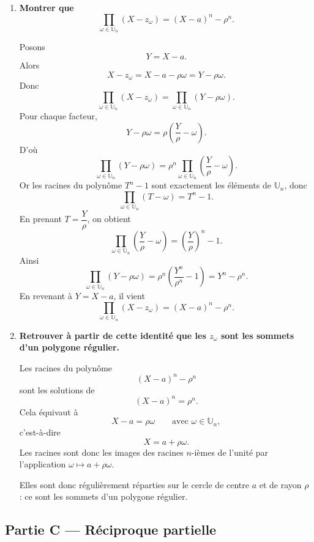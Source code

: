 \documentclass[11pt,a4paper]{article}
\newcommand{\U}{\mathbb{U}}
\begin{document}
\begin{enumerate}[label=\textbf{B.\arabic*.}]
    La quantité
    \[
    \frac1n\sum_{\omega\in\U_n}z_\omega
    \]
    est l’affixe du barycentre des sommets du polygone, pris avec des coefficients égaux.

    Le résultat signifie donc que le barycentre des sommets d’un polygone régulier est son centre.

    \item \textbf{Montrer que
    \[
    \prod_{\omega\in\U_n}(X-z_\omega)=(X-a)^n-\rho^n.
    \]}

    Posons
    \[
    Y=X-a.
    \]
    Alors
    \[
    X-z_\omega=X-a-\rho\omega=Y-\rho\omega.
    \]
    Donc
    \[
    \prod_{\omega\in\U_n}(X-z_\omega)=\prod_{\omega\in\U_n}(Y-\rho\omega).
    \]
    Pour chaque facteur,
    \[
    Y-\rho\omega=\rho\left(\frac{Y}{\rho}-\omega\right).
    \]
    D’où
    \[
    \prod_{\omega\in\U_n}(Y-\rho\omega)
    =\rho^n\prod_{\omega\in\U_n}\left(\frac{Y}{\rho}-\omega\right).
    \]
    Or les racines du polynôme \(T^n-1\) sont exactement les éléments de \(\U_n\), donc
    \[
    \prod_{\omega\in\U_n}(T-\omega)=T^n-1.
    \]
    En prenant \(T=\dfrac{Y}{\rho}\), on obtient
    \[
    \prod_{\omega\in\U_n}\left(\frac{Y}{\rho}-\omega\right)
    =\left(\frac{Y}{\rho}\right)^n-1.
    \]
    Ainsi
    \[
    \prod_{\omega\in\U_n}(Y-\rho\omega)
    =\rho^n\left(\frac{Y^n}{\rho^n}-1\right)=Y^n-\rho^n.
    \]
    En revenant à \(Y=X-a\), il vient
    \[
    \boxed{\prod_{\omega\in\U_n}(X-z_\omega)=(X-a)^n-\rho^n.}
    \]

    \item \textbf{Retrouver à partir de cette identité que les \(z_\omega\) sont les sommets d’un polygone régulier.}

    Les racines du polynôme
    \[
    (X-a)^n-\rho^n
    \]
    sont les solutions de
    \[
    (X-a)^n=\rho^n.
    \]
    Cela équivaut à
    \[
    X-a=\rho\omega
    \qquad\text{avec }\omega\in\U_n,
    \]
    c’est-à-dire
    \[
    X=a+\rho\omega.
    \]
    Les racines sont donc les images des racines \(n\)-ièmes de l’unité par l’application \(\omega\mapsto a+\rho\omega\).

    Elles sont donc régulièrement réparties sur le cercle de centre \(a\) et de rayon \(\rho\) : ce sont les sommets d’un polygone régulier.

\end{enumerate}

\subsection*{Partie C --- Réciproque partielle}
\end{document}
